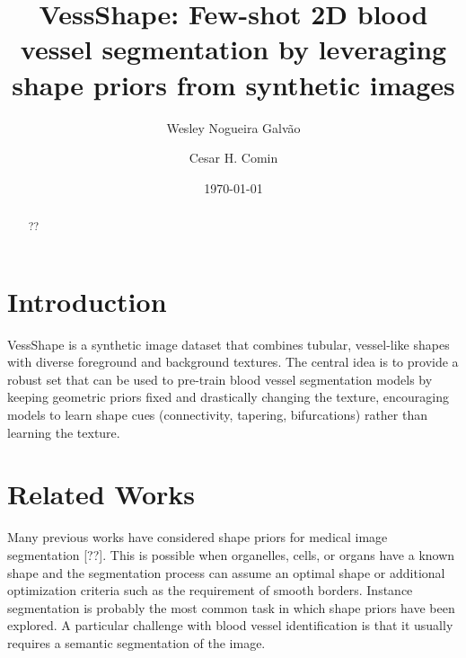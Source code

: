 \documentclass[%
reprint,
nofootinbib,
 amsmath,amssymb,
aps,
superscriptaddress,
showkeys,
longbibliography
]{revtex4-1}
\begin{document}



\title{VessShape: Few-shot 2D blood vessel segmentation by leveraging shape priors from synthetic images}

\author{Wesley Nogueira Galvão}


\author{Cesar H. Comin}

\date{\today}%

\begin{abstract}

??

\end{abstract}


\maketitle
\thispagestyle{plain}

\section{Introduction}
\label{sec:introduction}

VessShape is a synthetic image dataset that combines tubular, vessel-like shapes with diverse foreground and background textures. The central idea is to provide a robust set that can be used to pre-train blood vessel segmentation models by keeping geometric priors fixed and drastically changing the texture, encouraging models to learn shape cues (connectivity, tapering, bifurcations) rather than learning the texture.


\section{Related Works}
\label{sec:related}

Many previous works have considered shape priors for medical image segmentation [??]. This is possible when organelles, cells, or organs have a known shape and the segmentation process can assume an optimal shape or additional optimization criteria such as the requirement of smooth borders. Instance segmentation is probably the most common task in which shape priors have been explored. A particular challenge with blood vessel identification is that it usually requires a semantic segmentation of the image. 
\end{document}

